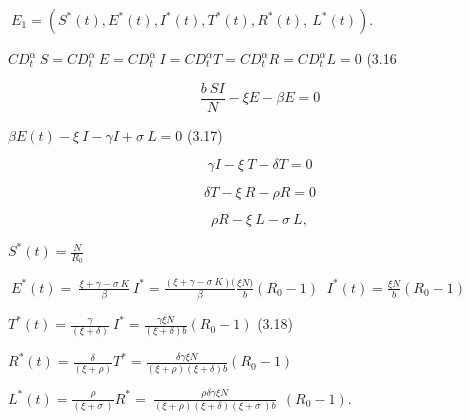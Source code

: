 \documentclass[10pt]{NSP1}
\begin{document}
\({\ E}_{1} = \left( S^{\ast}(t),E^{\ast}(t),I^{\ast}(t),T^{\ast}(t),R^{\ast}(t),\ L^{\ast}(t) \right).\)

\par\vspace{14.0pt}\vspace{14.0pt}

\par\vspace{14.0pt}\vspace{14.0pt}

\(CD_{t}^{\alpha}\ S = CD_{t}^{\alpha}\ E = CD_{t}^{\alpha}\ I = CD_{t}^{\alpha}T = CD_{t}^{\alpha}R = CD_{t}^{\alpha}L = 0\) (3.16

\par\vspace{14.0pt}\vspace{14.0pt}

\[
\frac{b\ SI}{N} - \xi E - \beta E = 0
\]

\(\beta E(t) - \xi\ I - \gamma I + \sigma\ L = 0\) (3.17)

\[
\gamma I - \xi\ T - \delta T = 0
\]

\[
\delta T - \xi\ R - \rho R = 0
\]

\[
\rho R - \xi\ L - \sigma\ L,
\]

\par\vspace{14.0pt}\vspace{14.0pt}

\(S^{\ast}(t) = \frac{N}{R_{0}}\)

\(\ E^{\ast}(t) = \ \frac{\xi + \gamma - \sigma\ K}{\beta}{\ I}^{\ast} = \frac{(\xi + \gamma - \sigma\ K)(}{\beta}\frac{\xi N)}{b}(R_{0} - 1)\) \({\ I}^{\ast}(t) = \frac{\xi N}{b}(R_{0} - 1)\)

\(T^{\ast}(t) = \frac{\gamma}{(\xi + \delta)}{\ I}^{\ast} = \frac{\gamma\xi N}{(\xi + \delta)b}(R_{0} - 1)\) (3.18)

\(R^{\ast}(t) = \frac{\delta}{(\xi + \rho)}T^{\ast} = \frac{\delta\gamma\xi N}{(\xi + \rho)(\xi + \delta)b}(R_{0} - 1)\)

\(L^{\ast}(t) = \frac{\rho}{(\xi + \sigma\ )}R^{\ast} = \ \frac{\rho\delta\gamma\xi N}{(\xi + \rho)(\xi + \delta)(\xi + \sigma\ )b}\ \ (R_{0} - 1)\).
\end{document}

